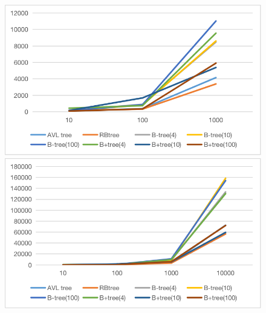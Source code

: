 \documentclass{article}
\begin{document}
\begin{figure}[htbp]
    \begin{minipage}{0.49\linewidth}
		\centering
		\includegraphics[width = \textwidth]{result3.png}
	\end{minipage}
    \begin{minipage}{0.49\linewidth}
		\centering
		\includegraphics[width = \textwidth]{result4.png}
	\end{minipage}


\end{figure}
\end{document}

